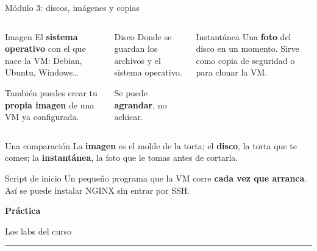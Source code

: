 \documentclass[aspectratio=169,10pt,c]{beamer}
\begin{document}
\begin{frame}{Módulo 3: discos, imágenes y copias}
\begin{columns}[T,onlytextwidth]
\begin{block}{Imagen}
\small El \textbf{sistema operativo} con el que nace la VM: Debian, Ubuntu, Windows\ldots{}\par\smallskip
También puedes crear tu \textbf{propia imagen} de una VM ya configurada.
\end{block}
\begin{block}{Disco}
\small Donde se guardan los archivos y el sistema operativo.\par\smallskip
Se puede \textbf{agrandar}, no achicar.
\end{block}
\begin{block}{Instantánea}
\small Una \textbf{foto} del disco en un momento. Sirve como copia de seguridad o para clonar la VM.
\end{block}
\end{columns}
\par\vspace{3mm}
\begin{exampleblock}{Una comparación}
\small La \textbf{imagen} es el molde de la torta; el \textbf{disco}, la torta que te comes; la \textbf{instantánea}, la foto que le tomas antes de cortarla.
\end{exampleblock}
\begin{alertblock}{Script de inicio}
\small Un pequeño programa que la VM corre \textbf{cada vez que arranca}. Así se puede instalar NGINX sin entrar por SSH.
\end{alertblock}
\end{frame}

\begin{frame}[plain]
\vfill
\begin{center}
{\fontsize{29}{34}\selectfont\bfseries Práctica}\par
\vspace{2mm}
{\small Los labs del curso}\par
\vspace{4mm}
{\color{utpRojo}\rule{8.5cm}{1.2pt}}
\end{center}
\vfill
\end{frame}
\end{document}

